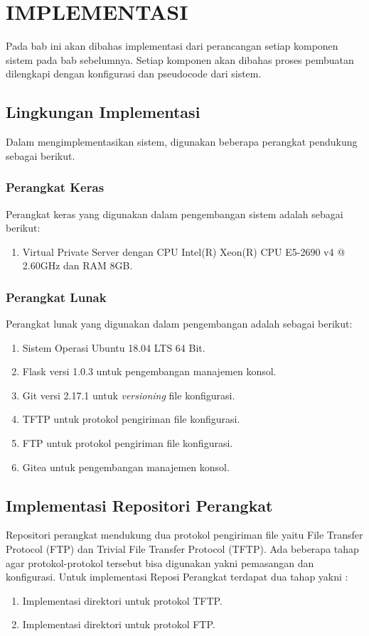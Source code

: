 \chapter{IMPLEMENTASI}
	Pada bab ini akan dibahas implementasi dari perancangan setiap komponen sistem pada bab sebelumnya. Setiap komponen akan dibahas proses pembuatan dilengkapi dengan konfigurasi dan pseudocode dari sistem.
	\section{Lingkungan Implementasi}
       Dalam mengimplementasikan sistem, digunakan beberapa perangkat pendukung sebagai berikut.
       \subsection{Perangkat Keras}
        	Perangkat keras yang digunakan dalam pengembangan sistem adalah sebagai berikut:
        	\begin{enumerate}
        		\item Virtual Private Server dengan CPU Intel(R) Xeon(R) CPU E5-2690 v4 @ 2.60GHz dan RAM 8GB.
        	\end{enumerate}
            
       \subsection{Perangkat Lunak}
    	    Perangkat lunak yang digunakan dalam pengembangan adalah sebagai berikut:
    	    \begin{enumerate}
    	    	\item Sistem Operasi Ubuntu 18.04 LTS 64 Bit.
    	    	\item Flask versi 1.0.3 untuk pengembangan manajemen konsol.
    	    	\item Git versi 2.17.1 untuk \textit{versioning} file konfigurasi.
    	    	\item TFTP untuk protokol pengiriman file konfigurasi.
    	    	\item FTP untuk protokol pengiriman file konfigurasi.
    	    	\item Gitea untuk pengembangan manajemen konsol. 
    	    	
    	    \end{enumerate}
       
    \section{Implementasi Repositori Perangkat}
    	Repositori perangkat mendukung dua protokol pengiriman file yaitu File Transfer Protocol (FTP) dan Trivial File Transfer Protocol (TFTP). Ada beberapa tahap agar protokol-protokol tersebut bisa digunakan yakni pemasangan dan konfigurasi. Untuk implementasi Reposi Perangkat terdapat dua tahap yakni :
    	\begin{enumerate}
    		\item Implementasi direktori untuk protokol TFTP.
    		\item Implementasi direktori untuk protokol FTP.
    	\end{enumerate}
